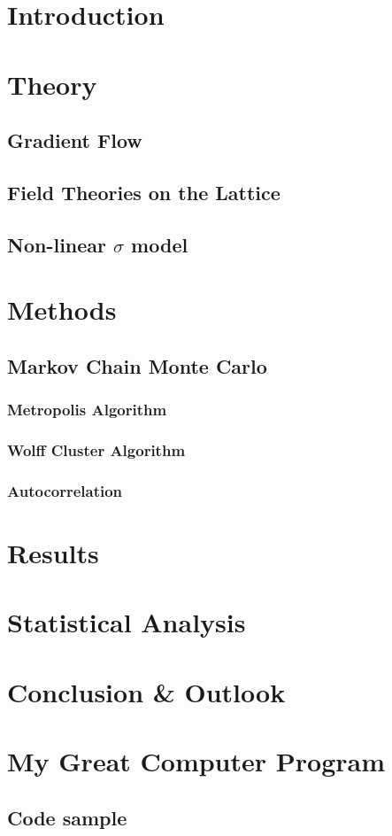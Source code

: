 \documentclass[12pt]{report}
\begin{document}
\chapter{Introduction}



\chapter{Theory}
\section{Gradient Flow}
\section{Field Theories on the Lattice}
\section{Non-linear $\sigma$ model}

\chapter{Methods}
\section{Markov Chain Monte Carlo}
\subsection{Metropolis Algorithm}
\subsection{Wolff Cluster Algorithm}
\subsection{Autocorrelation}

\chapter{Results}
\chapter{Statistical Analysis}

\chapter{Conclusion \& Outlook}



\appendix
\chapter{My Great Computer Program}

\section{Code sample}

\end{document}
